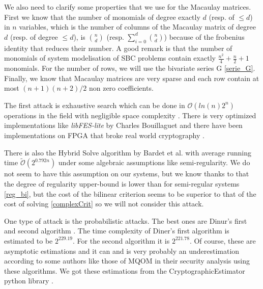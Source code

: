 \documentclass[english]{article}
\begin{document}
		We also need to clarify some properties that we use for the Macaulay matrices. First we know that the number of monomials of degree exactly $d$ (resp. of $\leq d$) in $n$ variables, which is the number of columns of the Macaulay matrix of degree $d$ (resp. of degree $\leq d$), is $\binom{n}{d}$ (resp. $\sum_{i=0}^{d}\binom{n}{d}$) because of the frobenius identity that reduces their number. A good remark is that the number of monomials of system modelisation of SBC problems contain exactly $\frac{n^2}{4} + \frac{n}{2} + 1$ monomials. For the number of rows, we will use the bivariate series G \ref{serie_G}. Finally, we know that Macaulay matrices are very sparse and each row contain at most $(n+1)(n+2)/2$ non zero coefficients.
		
		The first attack is exhaustive search which can be done in $\mathcal{O}(ln(n)2^n)$ operations in the field with negligible space complexity \cite{BCC+10}.
		There is very optimized implementations like \textit{libFES-lite} \cite{Bouilla22} by Charles Bouillaguet and there have been implementations on FPGA that broke real world cryptography \cite{DDVY20}.
		
		There is also the Hybrid Solve algorithm by Bardet et al. \cite{BFSS13} with average running time $\tilde{\mathcal{O}}(2^{0.792n})$ under some algebraic assumptions like semi-regularity. We do not seem to have this assumption on our systems, but we know thanks to \cite{FSS11} that the degree of regularity upper-bound is lower than for semi-regular systems \ref{reg_bi}, but the cost of the bilinear criterion seems to be superior to that of the cost of solving \ref{complexCrit} so we will not consider this attack.
		
		One type of attack is the probabilistic attacks. The best ones are Dinur's first and second algorithm \cite{Itai21A, Itai21B}.
		The time complexity of Diner's first algorithm is estimated to be $2^{229.19}$. For the second algorithm it is $2^{221.78}$. Of course, these are asymptotic estimations and it can and is very probably an underestimation according to some authors like those of MQOM in their security analysis using these algorithms. We got these estimations from the CryptographicEstimator python library \cite{EVZ+24}.
		
\end{document}
